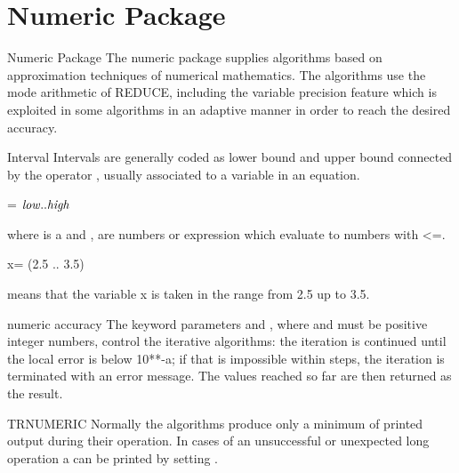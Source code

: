 \newpage
\section{Numeric Package}
\begin{Introduction}{Numeric Package}
The numeric package supplies algorithms based on approximation
techniques of numerical mathematics. The algorithms use
the  mode arithmetic of REDUCE, including
the variable precision feature which is exploited in some
algorithms in an adaptive manner in order to reach the
desired accuracy.
\end{Introduction}

\begin{Type}{Interval} 
Intervals are generally coded as lower bound and
upper bound connected by the operator , usually 
associated to a variable in an 
equation. 

\begin{Syntax}
   = \(\meta{low} .. \meta{high}\)
\end{Syntax}

where  is a  and ,  are
numbers or expression which evaluate to numbers with <=.

\begin{Examples}
     x= (2.5 .. 3.5) 
\end{Examples}

means that the variable x is taken in the range from 2.5 up to
3.5. 


\end{Type}

\begin{Concept}{numeric accuracy} 
The keyword parameters  and , 
where and  must be positive integer numbers, control the
iterative algorithms: the iteration is continued until
the local error is below 10**{-a}; if that is impossible
within  steps, the iteration is terminated with an
error message. The values reached so far are then returned
as the result.
\end{Concept}

\begin{Switch}{TRNUMERIC}
Normally the algorithms produce only a minimum of printed
output during their operation. In cases of an unsuccessful 
or unexpected long operation a  can be
printed by setting  .
\end{Switch}

